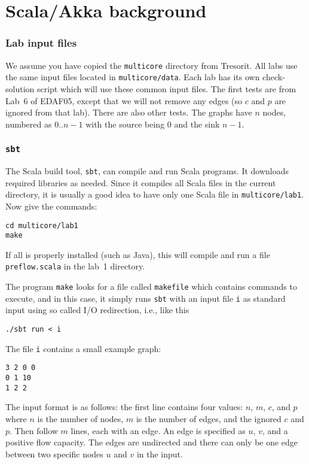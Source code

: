 \documentclass{forsete}
\begin{document}
{\newpage
\section{Scala/Akka background}

\subsubsection*{Lab input files}
We assume you have copied the {\tt multicore} directory from Tresorit.
All labs use the same input files located in {\tt multicore/data}.
Each lab has its own check-solution script which will use these common
input files. The first tests are from Lab~6 of EDAF05, except that we will not
remove any edges (so $c$ and $p$ are ignored from that lab). There are also other tests.
The graphs have $n$ nodes, numbered as $0..n-1$ with the source being $0$ and
the sink $n-1$.

\subsubsection*{{\tt sbt}}
The Scala build tool, {\tt sbt}, can compile and run Scala programs. It downloads required libraries as needed.
Since it compiles all Scala files in the current directory, it is usually a good idea to have only one Scala file
in {\tt multicore/lab1}.
Now give the commands:
\begin{verbatim}
cd multicore/lab1
make
\end{verbatim}
If all is properly installed (such as Java), this will compile and run a file {\tt preflow.scala} in the
lab~1 directory.

The program {\tt make} looks for a file called {\tt makefile} which contains commands to execute, and in this
case, it simply runs {\tt sbt} with an input file {\tt i} as standard input using so called I/O redirection, i.e.,
like this
\begin{verbatim}
./sbt run < i
\end{verbatim}
The file {\tt i} contains a small example graph:
\begin{verbatim}
3 2 0 0
0 1 10
1 2 2
\end{verbatim}
The input format is as follows: the first line contains four values: $n$, $m$, $c$, and $p$ where $n$ is the number of nodes, $m$ is the number of edges, and the ignored $c$ and $p$.
Then follow $m$ lines, each with an edge. An edge is specified as $u$, $v$, and a positive flow capacity. The edges
are undirected and there can only be one edge between two specific nodes $u$ and $v$ in the input.

}
\end{document}
